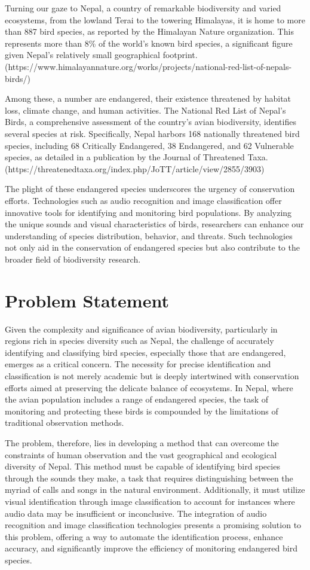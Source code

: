 Turning our gaze to Nepal, a country of remarkable biodiversity and varied ecosystems, from the lowland Terai to the towering Himalayas, it is home to more than 887 bird species, as reported by the Himalayan Nature organization. This represents more than 8\% of the world's known bird species, a significant figure given Nepal's relatively small geographical footprint. (https://www.himalayannature.org/works/projects/national-red-list-of-nepals-birds/)

Among these, a number are endangered, their existence threatened by habitat loss, climate change, and human activities. The National Red List of Nepal's Birds, a comprehensive assessment of the country's avian biodiversity, identifies several species at risk. Specifically, Nepal harbors 168 nationally threatened bird species, including 68 Critically Endangered, 38 Endangered, and 62 Vulnerable species, as detailed in a publication by the Journal of Threatened Taxa. (https://threatenedtaxa.org/index.php/JoTT/article/view/2855/3903)

The plight of these endangered species underscores the urgency of conservation efforts. Technologies such as audio recognition and image classification offer innovative tools for identifying and monitoring bird populations. By analyzing the unique sounds and visual characteristics of birds, researchers can enhance our understanding of species distribution, behavior, and threats. Such technologies not only aid in the conservation of endangered species but also contribute to the broader field of biodiversity research.

  
\section{Problem Statement}
Given the complexity and significance of avian biodiversity, particularly in regions rich in species diversity such as Nepal, the challenge of accurately identifying and classifying bird species, especially those that are endangered, emerges as a critical concern. The necessity for precise identification and classification is not merely academic but is deeply intertwined with conservation efforts aimed at preserving the delicate balance of ecosystems. In Nepal, where the avian population includes a range of endangered species, the task of monitoring and protecting these birds is compounded by the limitations of traditional observation methods.

The problem, therefore, lies in developing a method that can overcome the constraints of human observation and the vast geographical and ecological diversity of Nepal. This method must be capable of identifying bird species through the sounds they make, a task that requires distinguishing between the myriad of calls and songs in the natural environment. Additionally, it must utilize visual identification through image classification to account for instances where audio data may be insufficient or inconclusive. The integration of audio recognition and image classification technologies presents a promising solution to this problem, offering a way to automate the identification process, enhance accuracy, and significantly improve the efficiency of monitoring endangered bird species.

